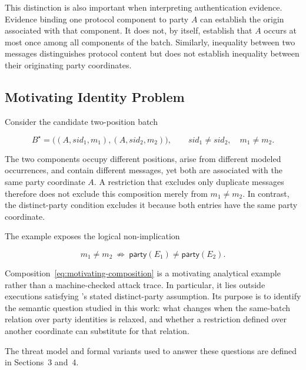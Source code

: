 This distinction is also important when interpreting authentication evidence.
Evidence binding one protocol component to party $A$ can establish the origin
associated with that component. It does not, by itself, establish that $A$
occurs at most once among all components of the batch. Similarly, inequality
between two messages distinguishes protocol content but does not establish
inequality between their originating party coordinates.

\subsection{Motivating Identity Problem}

Consider the candidate two-position batch

\begin{equation}
  B^{\star}
  =\bigl((A,\mathit{sid}_1,m_1),
          (A,\mathit{sid}_2,m_2)\bigr),
  \qquad
  \mathit{sid}_1\neq\mathit{sid}_2,
  \quad m_1\neq m_2.
  \label{eq:motivating-composition}
\end{equation}

The two components occupy different positions, arise from different modeled
occurrences, and contain different messages, yet both are associated with the
same party coordinate $A$. A restriction that excludes only duplicate
messages therefore does not exclude this composition merely from
$m_1\neq m_2$. In contrast, the distinct-party condition excludes it because
both entries have the same party coordinate.

The example exposes the logical non-implication

\begin{equation}
  m_1\neq m_2
  \ \not\Longrightarrow\ 
  \mathsf{party}(E_1)\neq\mathsf{party}(E_2).
  \label{eq:message-does-not-imply-party}
\end{equation}

Composition~\eqref{eq:motivating-composition} is a motivating analytical
example rather than a machine-checked attack trace. In particular, it lies
outside executions satisfying \kwaay's stated distinct-party assumption.
Its purpose is to identify the semantic question studied in this work: what
changes when the same-batch relation over party identities is relaxed, and
whether a restriction defined over another coordinate can substitute for that
relation.

The threat model and formal variants used to answer these questions are
defined in Sections~3 and~4.

